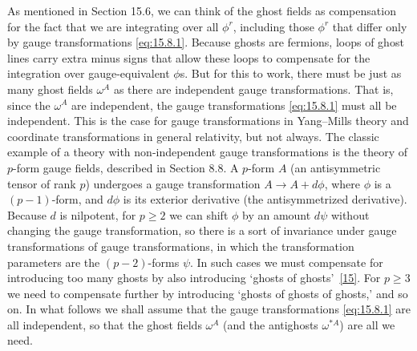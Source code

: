 As mentioned in Section 15.6, we can think of the ghost fields as compensation for the fact that we are integrating over all $\phi^r$, including those $\phi^r$ that differ only by gauge transformations \eqref{eq:15.8.1}. Because ghosts are fermions, loops of ghost lines carry extra minus signs that allow these loops to compensate for the integration over gauge-equivalent $\phi$s. But for this to work, there must be just as many ghost fields $\omega^A$ as there are independent gauge transformations. That is, since the $\omega^A$ are independent, the gauge transformations \eqref{eq:15.8.1} must all be independent. This is the case for gauge transformations in Yang--Mills theory and coordinate transformations in general relativity, but not always. The classic example of a theory with non-independent gauge transformations is the theory of $p$-form gauge fields, described in Section 8.8. A $p$-form $A$ (an antisymmetric tensor of rank $p$) undergoes a gauge transformation $A\longrightarrow A+d\phi$, where $\phi$ is a $(p-1)$-form, and $d\phi$ is its exterior derivative (the antisymmetrized derivative). Because $d$ is nilpotent, for $p\geq2$ we can shift $\phi$ by an amount $d\psi$ without changing the gauge transformation, so there is a sort of invariance under gauge transformations of gauge transformations, in which the transformation parameters are the $(p-2)$-forms $\psi$. In such cases we must compensate for introducing too many ghosts by also introducing `ghosts of ghosts'~\hyperref[ch15-ref-15]{[15]}. For $p\geq3$ we need to compensate further by introducing `ghosts of ghosts of ghosts,' and so on. In what follows we shall assume that the gauge transformations \eqref{eq:15.8.1} are all independent, so that the ghost fields $\omega^A$ (and the antighosts $\omega^{*A}$) are all we need.

